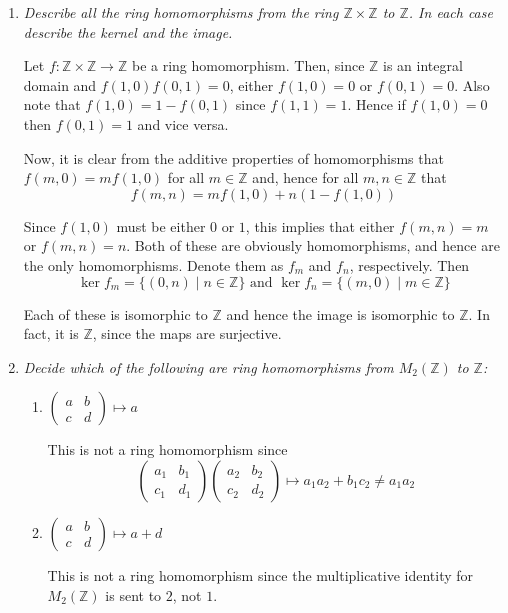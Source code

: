 \documentclass[letterpaper, 11pt]{article}
\newcommand{\Z}{\mathbb{Z}}
\begin{document}
\begin{enumerate}
\item \emph{Describe all the ring homomorphisms from the ring $\Z \times \Z$ to $\Z$.  In each case describe the kernel and the image.}

Let $f: \Z \times \Z \rightarrow \Z$ be a ring homomorphism.  Then, since $\Z$ is an integral domain and $f(1,0)f(0,1) = 0$, either $f(1,0) = 0$ or $f(0,1) = 0$.  Also note that $f(1,0) = 1 - f(0,1)$ since $f(1,1) = 1$.  Hence if $f(1,0) = 0$ then $f(0,1) = 1$ and vice versa.

Now, it is clear from the additive properties of homomorphisms that $f(m,0) = mf(1,0)$ for all $m \in \Z$ and, hence for all $m,n \in \Z$ that
\[
f(m,n) = mf(1,0) + n(1-f(1,0))
\]

Since $f(1,0)$ must be either $0$ or $1$, this implies that either $f(m,n) = m$ or $f(m,n) = n$.  Both of these are obviously homomorphisms, and hence are the only homomorphisms.  Denote them as $f_m$ and $f_n$, respectively.  Then
\[
\ker f_m = \{(0,n) \mid n \in \Z\} \mbox{ and } \ker f_n = \{(m,0) \mid m \in \Z \}
\]

Each of these is isomorphic to $\Z$ and hence the image is isomorphic to $\Z$.  In fact, it is $\Z$, since the maps are surjective.

\item \emph{Decide which of the following are ring homomorphisms from $M_2(\Z)$ to $\Z$:}
\begin{enumerate}
\item $\left( \begin{array}{cc} a & b \\ c & d \end{array}\right) \mapsto a$

This is not a ring homomorphism since
\[
\left(\begin{array}{cc} a_1 & b_1 \\ c_1 & d_1 \end{array}\right)
\left(\begin{array}{cc} a_2 & b_2 \\ c_2 & d_2 \end{array}\right) \mapsto a_1a_2 + b_1c_2 \neq a_1a_2
\]
\item $\left( \begin{array}{cc} a & b \\ c & d \end{array}\right) \mapsto a+d$

This is not a ring homomorphism since the multiplicative identity for $M_2(\Z)$ is sent to $2$, not $1$.


\end{enumerate}
\end{enumerate}
\end{document}
